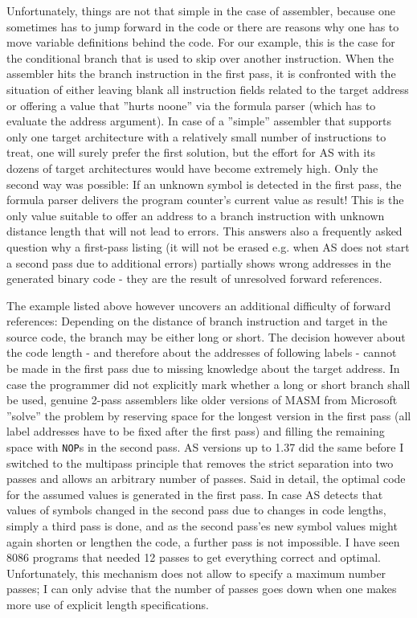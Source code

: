 \documentclass[12pt,twoside]{report}
\newcommand{\tty}[1]{{\tt #1}}
\begin{document}
Unfortunately, things are not that simple in the case of assembler,
because one sometimes has to jump forward in the code or there are
reasons why one has to move variable definitions behind the code.
For our example, this is the case for the conditional branch that is
used to skip over another instruction.  When the assembler hits the
branch instruction in the first pass, it is confronted with the
situation of either leaving blank all instruction fields related to
the target address or offering a value that ''hurts noone'' via the
formula parser (which has to evaluate the address argument).  In case
of a ''simple'' assembler that supports only one target architecture
with a relatively small number of instructions to treat, one will
surely prefer the first solution, but the effort for AS with its
dozens of target architectures would have become extremely high.
Only the second way was possible: If an unknown symbol is detected in
the first pass, the formula parser delivers the program counter's
current value as result!  This is the only value suitable to offer an
address to a branch instruction with unknown distance length that
will not lead to errors.  This answers also a frequently asked
question why a first-pass listing (it will not be erased e.g. when AS
does not start a second pass due to additional errors) partially
shows wrong addresses in the generated binary code - they are the
result of unresolved forward references.

The example listed above however uncovers an additional difficulty of
forward references: Depending on the distance of branch instruction
and target in the source code, the branch may be either long or
short.  The decision however about the code length - and therefore
about the addresses of following labels - cannot be made in the first
pass due to missing knowledge about the target address.  In case the
programmer did not explicitly mark whether a long or short branch
shall be used, genuine 2-pass assemblers like older versions of MASM
from Microsoft ''solve'' the problem by reserving space for the longest
version in the first pass (all label addresses have to be fixed after
the first pass) and filling the remaining space with \tty{NOP}s in the
second pass.  AS versions up to 1.37 did the same before I switched
to the multipass principle that removes the strict separation into
two passes and allows an arbitrary number of passes.  Said in detail,
the optimal code for the assumed values is generated in the first
pass.  In case AS detects that values of symbols changed in the second
pass due to changes in code lengths, simply a third pass is done, and
as the second pass'es new symbol values might again shorten or
lengthen the code, a further pass is not impossible.  I have seen
8086 programs that needed 12 passes to get everything correct and
optimal.  Unfortunately, this mechanism does not allow to specify a
maximum number passes; I can only advise that the number of passes
goes down when one makes more use of explicit length specifications.
\end{document}
